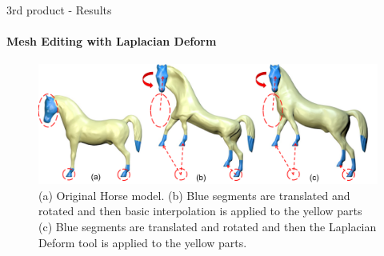 \documentclass[10pt, compress, english]{beamer}
\begin{document}
\begin{frame}{3rd product - Results}


\framesubtitle{Mesh Editing with Laplacian Deform}


\begin{figure}[H]
\includegraphics[width=1\textwidth]{img/horse}

\protect\caption{(a) Original Horse model. (b) Blue segments are translated and
rotated and then basic interpolation is applied to the yellow parts
(c) Blue segments are translated and rotated and then the Laplacian
Deform tool is applied to the yellow parts.}
\end{figure}


\end{frame} 
\end{document}
